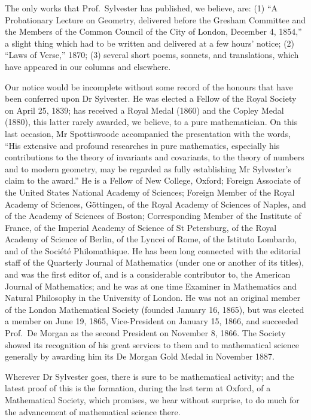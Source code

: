 \documentclass[11pt,a4paper]{book}
\begin{document}
The only works that Prof.\ Sylvester has published, we believe, are: (1) ``A Probationary Lecture on Geometry, delivered before the Gresham Committee and the Members of the Common Council of the City of London, December 4, 1854,'' a slight thing which had to be written and delivered at a few hours' notice; (2) ``Laws of Verse,'' 1870; (3) several short poems, sonnets, and translations, which have appeared in our columns and elsewhere.

Our notice would be incomplete without some record of the honours that have been conferred upon Dr Sylvester. He was elected a Fellow of the Royal Society on April 25, 1839; has received a Royal Medal (1860) and the Copley Medal (1880), this latter rarely awarded, we believe, to a pure mathematician. On this last occasion, Mr Spottiswoode accompanied the presentation with the words, ``His extensive and profound researches in pure mathematics, especially his contributions to the theory of invariants and covariants, to the theory of numbers and to modern geometry, may be regarded as fully establishing Mr Sylvester's claim to the award.'' He is a Fellow of New College, Oxford; Foreign Associate of the United States National Academy of Sciences; Foreign Member of the Royal Academy of Sciences, G\"ottingen, of the Royal Academy of Sciences of Naples, and of the Academy of Sciences of Boston; Corresponding Member of the Institute of France, of the Imperial Academy of Science of St Petersburg, of the Royal Academy of Science of Berlin, of the Lyncei of Rome, of the Istituto Lombardo, and of the Soci\'et\'e Philomathique. He has been long connected with the editorial staff of the Quarterly Journal of Mathematics (under one or another of its titles), and was the first editor of, and is a considerable contributor to, the American Journal of Mathematics; and he was at one time Examiner in Mathematics and Natural Philosophy in the University of London. He was not an original member of the London Mathematical Society (founded January 16, 1865), but was elected a member on June 19, 1865, Vice-President on January 15, 1866, and succeeded Prof.\ De Morgan as the second President on November 8, 1866. The Society showed its recognition of his great services to them and to mathematical science generally by awarding him its De Morgan Gold Medal in November 1887.

Wherever Dr Sylvester goes, there is sure to be mathematical activity; and the latest proof of this is the formation, during the last term at Oxford, of a Mathematical Society, which promises, we hear without surprise, to do much for the advancement of mathematical science there.
\end{document}
